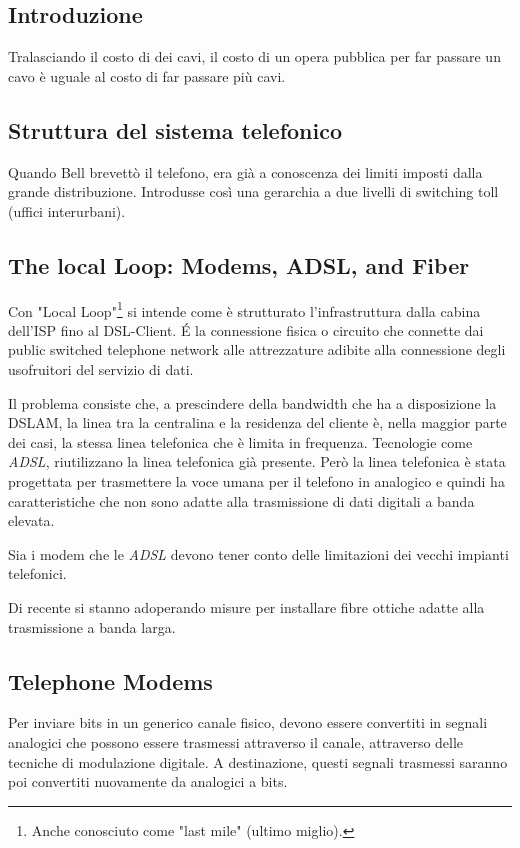 \documentclass[../ComputerNetworks.tex]{subfiles}
\begin{document}
\subsection{Introduzione}

Tralasciando il costo di dei cavi, il costo di un opera pubblica per far passare un cavo è uguale al costo di far passare più cavi.

\subsection{Struttura del sistema telefonico}

Quando Bell brevettò il telefono, era già a conoscenza dei limiti imposti dalla grande distribuzione.
Introdusse così una gerarchia a due livelli di switching toll (uffici interurbani).

\subsection{The local Loop: Modems, ADSL, and Fiber}

Con "Local Loop"\footnote{Anche conosciuto come "last mile" (ultimo miglio).} si intende come è strutturato l'infrastruttura dalla cabina dell'ISP fino al DSL-Client.
\'E la connessione fisica o circuito che connette dai public switched telephone network alle attrezzature adibite alla connessione degli usofruitori del servizio di dati.

Il problema consiste che, a prescindere della bandwidth che ha a disposizione la DSLAM, la linea tra la centralina e la residenza del cliente è, nella maggior parte dei casi, la stessa linea telefonica che è limita in frequenza.
Tecnologie come \emph{ADSL}, riutilizzano la linea telefonica già presente.
Però la linea telefonica è stata progettata per trasmettere la voce umana per il telefono in analogico e quindi ha caratteristiche che non sono adatte alla trasmissione di dati digitali a banda elevata.

Sia i modem che le \emph{ADSL} devono tener conto delle limitazioni dei vecchi impianti telefonici.

Di recente si stanno adoperando misure per installare fibre ottiche adatte alla trasmissione a banda larga.

\subsection{Telephone Modems}

Per inviare bits in un generico canale fisico, devono essere convertiti in segnali analogici che possono essere trasmessi attraverso il canale, attraverso delle tecniche di modulazione digitale.
A destinazione, questi segnali trasmessi saranno poi convertiti nuovamente da analogici a bits.
\end{document}
